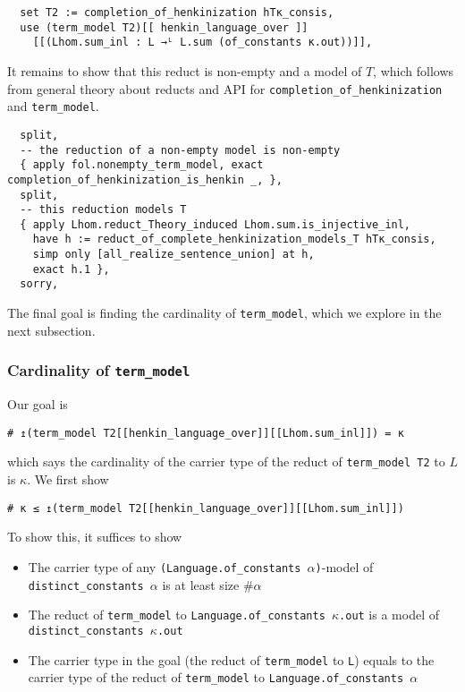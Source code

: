 \documentclass{article}
\newcommand{\al}{\alpha}
\newcommand{\<}{\langle}
\renewcommand{\>}{\rangle}
\theoremstyle{definitionstyle}
\theoremstyle{exercisestyle}
\theoremstyle{remarkstyle}
\begin{document}
\begin{lstlisting}
  set T2 := completion_of_henkinization hTκ_consis,
  use (term_model T2)[[ henkin_language_over ]]
    [[(Lhom.sum_inl : L →ᴸ L.sum (of_constants κ.out))]], \end{lstlisting}

It remains to show that this reduct is non-empty and a model of $T$,
which follows from general theory about reducts and API for
\texttt{completion\_of\_henkinization} and \texttt{term\_model}.

\begin{lstlisting}
  split,
  -- the reduction of a non-empty model is non-empty
  { apply fol.nonempty_term_model, exact completion_of_henkinization_is_henkin _, },
  split,
  -- this reduction models T
  { apply Lhom.reduct_Theory_induced Lhom.sum.is_injective_inl,
    have h := reduct_of_complete_henkinization_models_T hTκ_consis,
    simp only [all_realize_sentence_union] at h,
    exact h.1 },
  sorry, \end{lstlisting}

The final goal is finding the cardinality of \texttt{term\_model},
which we explore in the next subsection.

\subsubsection{Cardinality of \texttt{term\_model}}

Our goal is
\begin{lstlisting}
# ↥(term_model T2[[henkin_language_over]][[Lhom.sum_inl]]) = κ \end{lstlisting}
which says the cardinality of the carrier type of the
reduct of \texttt{term\_model T2} to $L$ is $\kappa$.
We first show 
\begin{lstlisting}
# κ ≤ ↥(term_model T2[[henkin_language_over]][[Lhom.sum_inl]]) \end{lstlisting}
To show this, it suffices to show
\begin{itemize}
  \item The carrier type of any \texttt{(Language.of\_constants $\al$)}-model of
        \texttt{distinct\_constants $\al$} is at least size $\# \al$
  \item The reduct of \texttt{term\_model} to
        \texttt{Language.of\_constants $\kappa$.out} is a model of
        \texttt{distinct\_constants $\kappa$.out}
  \item The carrier type in the goal (the reduct of \texttt{term\_model} to \texttt{L})
        equals to the carrier type of the reduct of \texttt{term\_model} to
        \texttt{Language.of\_constants $\al$}
\end{itemize}
\end{document}
